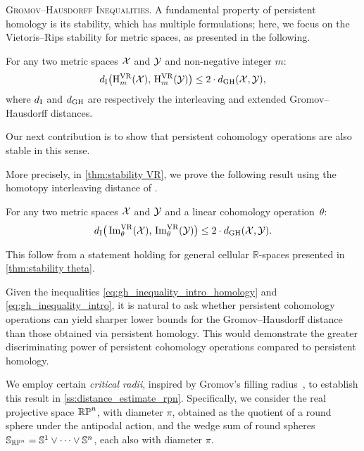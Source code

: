 \medskip\noindent\textsc{Gromov--Hausdorff Inequalities.}
A fundamental property of persistent homology is its stability, which has multiple formulations; here, we focus on the Vietoris--Rips stability for metric spaces, as presented in the following.
\begin{theorem*}
	For any two metric spaces $\mathcal{X}$ and $\mathcal{Y}$ and non-negative integer $m$:
	\begin{equation}\label{eq:gh_inequality_intro_homology}
		d_{\mathrm{I}}\big(\mathrm{H}_m^{\mathrm{VR}}(\mathcal{X}),\, \mathrm{H}_m^{\mathrm{VR}}(\mathcal{Y})\big) \leq 2 \cdot d_{\mathrm{GH}}(\mathcal{X},\mathcal{Y}),
	\end{equation}
	where \(d_{\mathrm{I}}\) and \(d_{\mathrm{GH}}\) are respectively the interleaving and extended Gromov--Hausdorff distances.
\end{theorem*}

Our next contribution is to show that persistent cohomology operations are also stable in this sense.

More precisely, in \cref{thm:stability VR}, we prove the following result using the homotopy interleaving distance of \cite{blumberg2023interleaving}.

\begin{introtheorem}\label{thm:stability intro}
	For any two metric spaces $\mathcal{X}$ and $\mathcal{Y}$ and a linear cohomology operation~$\theta$:
	\begin{equation}\label{eq:gh_inequality_intro}
		d_{\mathrm{I}}\big(\operatorname{Im}_\theta^{\mathrm{VR}}(\mathcal{X}),\, \operatorname{Im}_\theta^{\mathrm{VR}}(\mathcal{Y})\big) \leq 2 \cdot d_{\mathrm{GH}}(\mathcal{X},\mathcal{Y}).
	\end{equation}
\end{introtheorem}

This follow from a statement holding for general cellular $\mathbb{R}$-spaces presented in \cref{thm:stability theta}.

\medskip Given the inequalities \eqref{eq:gh_inequality_intro_homology} and \eqref{eq:gh_inequality_intro},
it is natural to ask whether persistent cohomology operations can yield sharper lower bounds for the Gromov--Hausdorff distance than those obtained via persistent homology.
This would demonstrate the greater discriminating power of persistent cohomology operations compared to persistent homology.

We employ certain \textit{critical radii}, inspired by Gromov's filling radius~\cite{gromov1983filling}, to establish this result in \cref{ss:distance_estimate_rpn}.
Specifically, we consider the real projective space \(\mathbb{RP}^n\), with diameter \(\pi\), obtained as the quotient of a round sphere under the antipodal action, and the wedge sum of round spheres \(\mathbb{S}_{\mathbb{RP}^n} = \mathbb{S}^1 \vee \dots \vee \mathbb{S}^n\), each also with diameter \(\pi\).

